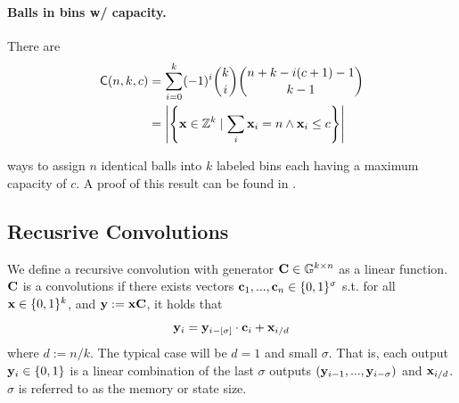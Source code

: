 \paragraph{Balls in bins w/ capacity.} There are
\begin{align*}
    \mathsf{C}(n,k,c) &= \sum_{i=0}^k (-1)^i \binom{k}{i} \binom{n+k -i (c+1)-1}{k-1}\\
    &=\left|\left\{ \mathbf{x}\in \mathbb{Z}^k \mid \sum_i \mathbf{x}_i = n \wedge \mathbf{x}_i \leq c \right\}\right|
\end{align*}

ways to assign $n$ identical balls into $k$ labeled bins each having a maximum capacity of $c$. A proof of this result can be found in \cite{bro19}.


\subsection{Recusrive Convolutions}

We define a recursive convolution with generator $\mathbf{C}\in \mathbb{G}^{k\times n}$ as a linear function. $\mathbf{C}$ is a convolutions if there exists vectors $\mathbf{c}_1,...,\mathbf{c}_n\in \{0,1\}^\sigma$ s.t. for all $\mathbf{x}\in \{0,1\}^k$, 
and $\mathbf{y}:=\mathbf{x}\mathbf{C}$, it holds that 
$$
    \mathbf{y}_i =\mathbf{y}_{i-[\sigma]} \cdot \mathbf{c}_i + \mathbf{x}_{i/d}
$$
where $d:=n/k$. The typical case will be $d=1$ and small $\sigma$.
That is, each output $\mathbf{y}_i\in \{0,1\}$ is a linear combination of the last $\sigma$ outputs $(\mathbf{y}_{i-1},...,\mathbf{y}_{i-\sigma})$ and $\mathbf{x}_{i/d}$. $\sigma$ is referred to as the memory or state size.


